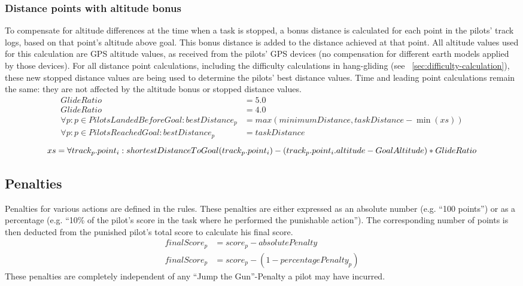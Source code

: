 \documentclass{article}
\begin{document}
\subsubsection{Distance points with altitude bonus}
\label{sec:distance-stopped-tasks}
To compensate for altitude differences at the time when a task is stopped,
a bonus distance is calculated for each point in the pilots’ track logs, based
on that point’s altitude above goal. This bonus distance is added to the
distance achieved at that point. All altitude values used for this calculation
are GPS altitude values, as received from the pilots’ GPS devices (no
compensation for different earth models applied by those devices). For all
distance point calculations, including the difficulty calculations in
hang-gliding (see ~\ref{sec:difficulty-calculation}), these new stopped
distance values are being used to determine the pilots’ best distance values.
Time and leading point calculations remain the same: they are not affected by
the altitude bonus or stopped distance values.
\begin{align*}
    GlideRatio &= 5.0 \\
    GlideRatio &= 4.0 \\
    \forall p : p \in PilotsLandedBeforeGoal : bestDistance_p &= max(minimumDistance, taskDistance - \min(xs)) \\
    \forall p : p \in PilotsReachedGoal : bestDistance_p &= taskDistance
\end{align*}
\[ xs = \forall track_p . point_i : shortestDistanceToGoal(track_p . point_i) - (track_p . point_i . altitude - GoalAltitude) * GlideRatio \\ \]

\subsection{Penalties}
Penalties for various actions are defined in the rules. These penalties are
either expressed as an absolute number (e.g. “100 points”) or as a percentage
(e.g. “10\% of the pilot’s score in the task where he performed the punishable
action”). The corresponding number of points is then deducted from the punished
pilot’s total score to calculate his final score.
\begin{align*}
    finalScore_p &= score_p - absolutePenalty \\
    finalScore_p &= score_p - (1 - percentagePenalty_p)
\end{align*}
These penalties are completely independent of any “Jump the Gun”-Penalty
a pilot may have incurred.
\end{document}
